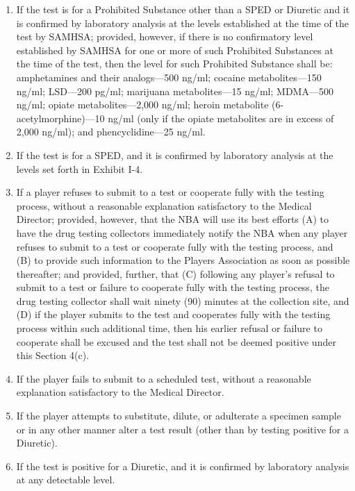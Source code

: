 \documentclass[
]{book}
\providecommand{\tightlist}{%
  \setlength{\itemsep}{0pt}\setlength{\parskip}{0pt}}
\begin{document}
\begin{enumerate}
  \begin{enumerate}
  \def\labelenumii{(\roman{enumii})}
  \tightlist
  \item
    If the test is for a Prohibited Substance other than a SPED or Diuretic and it is confirmed by laboratory analysis at the levels established at the time of the test by SAMHSA; provided, however, if there is no confirmatory level established by SAMHSA for one or more of such Prohibited Substances at the time of the test, then the level for such Prohibited Substance shall be: amphetamines and their analogs---500 ng/ml; cocaine metabolites---150 ng/ml; LSD---200 pg/ml; marijuana metabolites---15 ng/ml; MDMA---500 ng/ml; opiate metabolites---2,000 ng/ml; heroin metabolite (6-acetylmorphine)---10 ng/ml (only if the opiate metabolites are in excess of 2,000 ng/ml); and phencyclidine---25 ng/ml.
  \item
    If the test is for a SPED, and it is confirmed by laboratory analysis at the levels set forth in Exhibit I-4.
  \item
    If a player refuses to submit to a test or cooperate fully with the testing process, without a reasonable explanation satisfactory to the Medical Director; provided, however, that the NBA will use its best efforts (A) to have the drug testing collectors immediately notify the NBA when any player refuses to submit to a test or cooperate fully with the testing process, and (B) to provide such information to the Players Association as soon as possible thereafter; and provided, further, that (C) following any player's refusal to submit to a test or failure to cooperate fully with the testing process, the drug testing collector shall wait ninety (90) minutes at the collection site, and (D) if the player submits to the test and cooperates fully with the testing process within such additional time, then his earlier refusal or failure to cooperate shall be excused and the test shall not be deemed positive under this Section 4(c).
  \item
    If the player fails to submit to a scheduled test, without a reasonable explanation satisfactory to the Medical Director.
  \item
    If the player attempts to substitute, dilute, or adulterate a specimen sample or in any other manner alter a test result (other than by testing positive for a Diuretic).
  \item
    If the test is positive for a Diuretic, and it is confirmed by laboratory analysis at any detectable level.
  \end{enumerate}

\end{enumerate}
\end{document}
